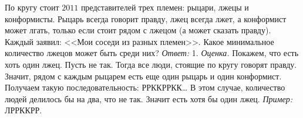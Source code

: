 \problem
По кругу стоит $2011$ представителей трех племен: рыцари, лжецы и конформисты.
Рыцарь всегда говорит правду, лжец всегда лжет, а конформист может лгать,
только если стоит рядом с лжецом (а может сказать правду).
Каждый заявил: <<Мои соседи из разных племен>>.
Какое минимальное количество лжецов может быть среди них?
\solution
\emph{Ответ:} 1.
\emph{Оценка.}
Покажем, что есть хоть один лжец.
Пусть не так.
Тогда все люди, стоящие по кругу говорят правду.
Значит, рядом с каждым рыцарем есть еще один рыцарь и один конформист.
Получаем такую последовательность: РРККРРКК\ldots
В этом случае, количество людей делилось бы на два, что не так.
Значит есть хотя бы один лжец.
\emph{Пример:} ЛРРККРР.
\endproblem
